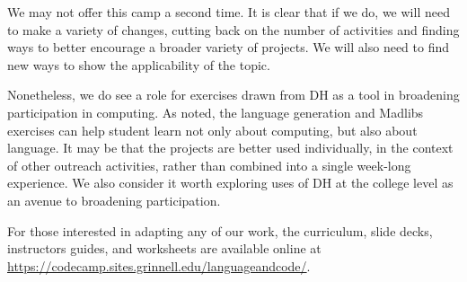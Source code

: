 We may not offer this camp a second time.  It is clear that if we
do, we will need to make a variety of changes, cutting back on the
number of activities and finding ways to better encourage a broader
variety of projects.  We will also need to find new ways to show
the applicability of the topic.

Nonetheless, we do see a role for exercises drawn from DH as a tool
in broadening participation in computing.  As noted, the language
generation and Madlibs exercises can help student learn not only
about computing, but also about language.  It may be that the
projects are better used individually, in the context of other
outreach activities, rather than combined into a single week-long
experience.  We also consider it worth exploring uses of DH
at the college level as an avenue to broadening participation.

For those interested in adapting any of our work, the curriculum,
slide decks, instructors guides, and worksheets are available online
at \url{https://codecamp.sites.grinnell.edu/languageandcode/}.
